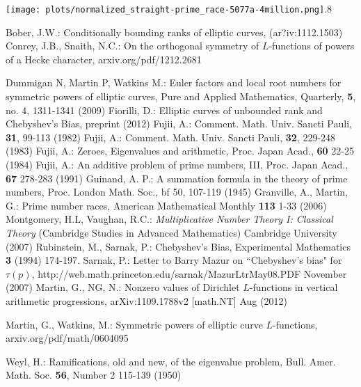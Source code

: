 \documentclass[11pt]{article}
\theoremstyle{plain}
\theoremstyle{definition}
\numberwithin{equation}{section}
\numberwithin{figure}{section}
\numberwithin{table}{section}
\begin{document}
     \texttt{[image: plots/normalized\_straight-prime\_race-5077a-4million.png]}{.8}~\label{nr389}







\begin{thebibliography}{bib}
 \label{B} Bober, J.W.: Conditionally bounding ranks of elliptic curves, (ar?iv:1112.1503)
 \label{C-S} Conrey, J.B., Snaith, N.C.:  On the orthogonal symmetry of $L$-functions of powers of a Hecke character, arxiv.org/pdf/1212.2681


 \label{DMW} Dummigan N, Martin P, Watkins M.: Euler factors and local root numbers for symmetric powers of elliptic curves, Pure and Applied Mathematics, Quarterly, {\bf 5},  no. 4, 1311-1341  (2009)
  \label{F}  Fiorilli, D.: Elliptic curves of unbounded rank and Chebyshev's Bias, preprint (2012)
        \label{Fu1} Fujii, A.:  Comment. Math. Univ. Sancti Pauli, {\bf 31}, 99-113 (1982)
        \label{Fu2} Fujii, A.:  Comment. Math. Univ. Sancti Pauli, {\bf 32}, 229-248 (1983)
      \label{Fu3} Fujii, A.: Zeroes, Eigenvalues and arithmetic, Proc. Japan Acad., {\bf 60} 22-25 (1984)
    \label{Fu4} Fujii, A.: An additive problem of prime numbers, III, Proc. Japan Acad., {\bf 67} 278-283 (1991)
   \label{G} Guinand, A. P.: A summation formula in the theory of prime numbers, Proc. London Math. Soc., {bf 50}, 107-119 (1945)
 \label{GM}  Granville, A., Martin, G.:  Prime number races,
American Mathematical Monthly {\bf 113} 1-33 (2006)
  \label{MV} Montgomery, H.L, Vaughan, R.C.:   {\it Multiplicative Number Theory I: Classical Theory} (Cambridge Studies in Advanced Mathematics) Cambridge University (2007)
  \label{R-S}   Rubinstein, M., Sarnak, P.: Chebyshev's Bias,  Experimental  Mathematics {\bf 3}  (1994) 174-197.
    \label{S} Sarnak, P.: Letter to Barry Mazur on ``Chebyshev's bias" for $\tau(p)$, http://web.math.princeton.edu/sarnak/MazurLtrMay08.PDF  November (2007)
  \label{M-N} Martin, G., NG, N.: Nonzero values of Dirichlet $L$-functions in vertical arithmetic progressions,
    arXiv:1109.1788v2 [math.NT]  Aug (2012)

        \label{M-W} Martin, G., Watkins, M.:  Symmetric powers of elliptic curve $L$-functions, arxiv.org/pdf/math/0604095

     \label{W}  Weyl, H.:  Ramifications, old and new, of the eigenvalue problem,  Bull. Amer. Math. Soc. {\bf 56}, Number 2 115-139 (1950)
\end{thebibliography}
\end{document}
